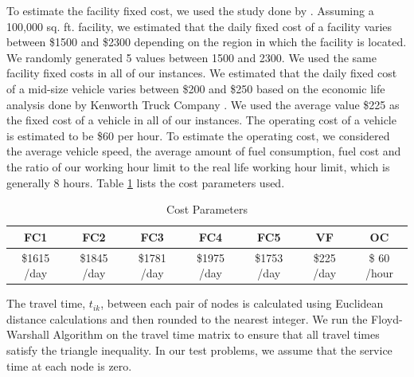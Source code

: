 To estimate the facility fixed cost, we used the study done by \citet{Burlett}. Assuming
a 100,000 sq. ft. facility, we estimated that the daily fixed cost of a facility varies 
between \$1500 and \$2300 depending on the region in which the facility is located. We 
randomly generated 5 values between 1500 and 2300. We used the same facility fixed 
costs in all of our instances. We estimated that the 
daily fixed cost of a mid-size vehicle varies between \$200 and \$250 based on the
economic life analysis done by  Kenworth Truck Company \citeyearpar{Kenworth}. We used
the average value \$225 as the fixed cost of a vehicle in all of our instances.  
The operating cost of a vehicle is estimated to be \$60 per hour. To estimate the
operating cost, we considered the average vehicle speed, the average amount of 
fuel consumption, fuel cost and the ratio of our working hour limit to the real
life working hour limit, which is generally 8 hours. Table \ref{costparam} lists 
the cost parameters used.  


\begin {table}[h]
\begin{center}
\caption {Cost Parameters} \label{costparam}
\begin {tabular}[t]{ccccccc} \hline
FC1 & FC2 & FC3 & FC4 & FC5 & VF & OC \\\hline
\$1615 /day  &	\$1845 /day  &	\$1781 /day  &	\$1975 /day  &	\$1753 /day  &   \$225 /day  & \$ 60 /hour  	 \\\hline
\end{tabular}
\end{center}
\end {table} 

The travel time, $t_{ik}$, between each pair of nodes is calculated using 
Euclidean distance calculations and then rounded to the nearest integer.  
We run the Floyd-Warshall Algorithm \citep{Ahuja} on the travel time
matrix to ensure that all travel times satisfy the triangle inequality.
In our test problems, we assume that the service time at each
node is zero. 
    
